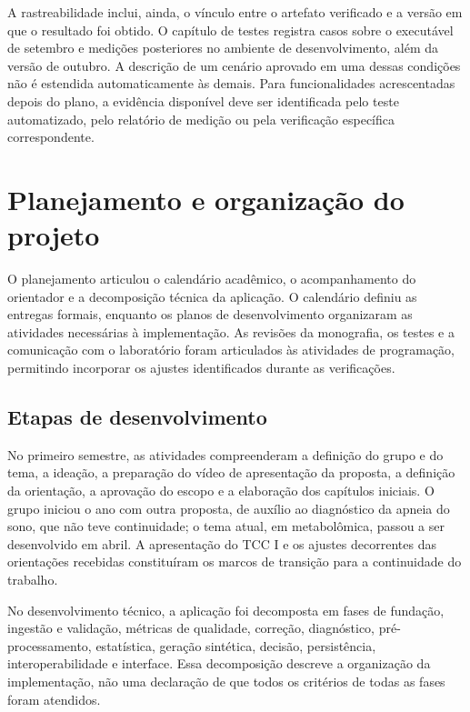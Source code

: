 A rastreabilidade inclui, ainda, o vínculo entre o artefato verificado e a versão em que o resultado foi obtido. O capítulo de testes registra casos sobre o executável de setembro e medições posteriores no ambiente de desenvolvimento, além da versão de outubro. A descrição de um cenário aprovado em uma dessas condições não é estendida automaticamente às demais. Para funcionalidades acrescentadas depois do plano, a evidência disponível deve ser identificada pelo teste automatizado, pelo relatório de medição ou pela verificação específica correspondente.

\section{Planejamento e organização do projeto}

O planejamento articulou o calendário acadêmico, o acompanhamento do orientador e a decomposição técnica da aplicação. O calendário definiu as entregas formais, enquanto os planos de desenvolvimento organizaram as atividades necessárias à implementação. As revisões da monografia, os testes e a comunicação com o laboratório foram articulados às atividades de programação, permitindo incorporar os ajustes identificados durante as verificações.

\subsection{Etapas de desenvolvimento}

No primeiro semestre, as atividades compreenderam a definição do grupo e do tema, a ideação, a preparação do vídeo de apresentação da proposta, a definição da orientação, a aprovação do escopo e a elaboração dos capítulos iniciais. O grupo iniciou o ano com outra proposta, de auxílio ao diagnóstico da apneia do sono, que não teve continuidade; o tema atual, em metabolômica, passou a ser desenvolvido em abril. A apresentação do TCC I e os ajustes decorrentes das orientações recebidas constituíram os marcos de transição para a continuidade do trabalho.

No desenvolvimento técnico, a aplicação foi decomposta em fases de fundação, ingestão e validação, métricas de qualidade, correção, diagnóstico, pré-processamento, estatística, geração sintética, decisão, persistência, interoperabilidade e interface. Essa decomposição descreve a organização da implementação, não uma declaração de que todos os critérios de todas as fases foram atendidos.

